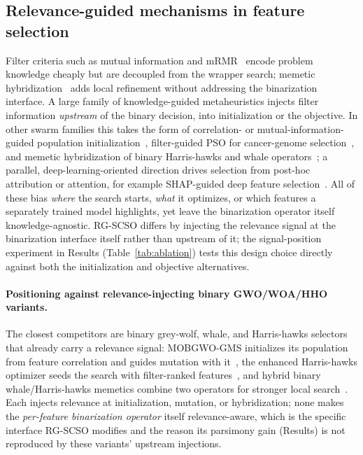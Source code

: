 \documentclass[iicol,sn-basic,pdflatex]{sn-jnl}
\begin{document}
\subsection{Relevance-guided mechanisms in feature selection}
Filter criteria such as mutual information and mRMR~\cite{guyon,mrmr} encode
problem knowledge cheaply but are decoupled from the wrapper search; memetic
hybridization~\cite{neri} adds local refinement without addressing the
binarization interface. A large family of knowledge-guided metaheuristics
injects filter information \emph{upstream} of the binary decision, into
initialization or the objective. In other swarm families this takes the form
of correlation- or mutual-information-guided population
initialization~\cite{mobgwogms2023,hhoelm2023}, filter-guided PSO for
cancer-genome selection~\cite{ludwig2025guided}, and memetic hybridization
of binary Harris-hawks and whale operators~\cite{whalehho2022}; a parallel,
deep-learning-oriented direction drives selection from post-hoc attribution
or attention, for example SHAP-guided deep feature
selection~\cite{xaifs2024}. All of these bias \emph{where} the search
starts, \emph{what} it optimizes, or which features a separately trained
model highlights, yet leave the binarization operator itself
knowledge-agnostic. RG-SCSO differs by injecting the relevance signal at the
binarization interface itself rather than upstream of it; the signal-position
experiment in Results (Table~\ref{tab:ablation}) tests this design choice
directly against both the initialization and objective alternatives.

\paragraph{Positioning against relevance-injecting binary GWO/WOA/HHO
variants.} The closest competitors are binary grey-wolf, whale, and
Harris-hawks selectors that already carry a relevance signal: MOBGWO-GMS
initializes its population from feature correlation and guides mutation with
it~\cite{mobgwogms2023}, the enhanced Harris-hawks optimizer seeds the search
with filter-ranked features~\cite{hhoelm2023}, and hybrid binary
whale/Harris-hawks memetics combine two operators for stronger local
search~\cite{whalehho2022}. Each injects relevance at initialization,
mutation, or hybridization; none makes the \emph{per-feature binarization
operator} itself relevance-aware, which is the specific interface RG-SCSO
modifies and the reason its parsimony gain (Results) is not reproduced by
these variants' upstream injections.
\end{document}
